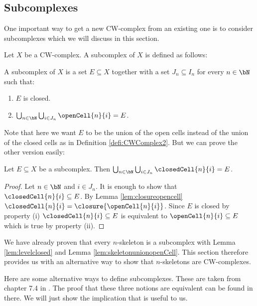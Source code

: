\subsection{Subcomplexes}\label{sec:mathsubcomplex}

One important way to get a new CW-complex from an existing one is to consider subcomplexes which we will discuss in this section. 

Let $X$ be a CW-complex. A subcomplex of $X$ is defined as follows:

\begin{defi} \label{defi:subcomplex}
    A subcomplex of $X$ is a set $E \subseteq X$ together with a set $J_n \subseteq I_n$ for every $n \in \bN$ such that:
    \begin{enumerate}
        \item $E$ is closed.
        \item $\bigcup_{n \in \bN} \bigcup_{i \in J_n} \openCell{n}{i} = E$.
    \end{enumerate}
\end{defi}

Note that here we want $E$ to be the union of the open cells instead of the union of the closed cells as in Definition \ref{defi:CWComplex2}. 
But we can prove the other version easily: 

\begin{lem} \label{lem:subcomplexunionclosed}
    Let $E \subseteq X$ be a subcomplex. 
    Then $\bigcup_{n \in \bN} \bigcup_{i \in J_n} \closedCell{n}{i} = E$.
\end{lem}
\begin{proof}
    Let $n \in \bN$ and $i \in J_n$. 
    It is enough to show that $\closedCell{n}{i} \subseteq E$. 
    By Lemma \ref{lem:closureopencell} $\closedCell{n}{i} = \closure{\openCell{n}{i}}$. 
    Since $E$ is closed by property (i) $\closedCell{n}{i} \subseteq E$ is equivalent to $\openCell{n}{i} \subseteq E$ which is true by property (ii).
\end{proof}

\begin{example}
    We have already proven that every $n$-skeleton is a subcomplex with Lemma \ref{lem:levelclosed} and Lemma \ref{lem:skeletonunionopenCell}. 
    This section therefore provides us with an alternative way to show that $n$-skeletons are CW-complexes.
\end{example}

Here are some alternative ways to define subcomplexes. 
These are taken from chapter 7.4 in \cite{Jänich2001}.
The proof that these three notions are equivalent can be found in there. 
We will just show the implication that is useful to us. 

